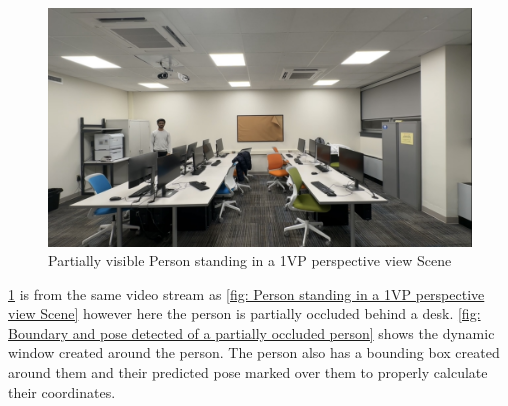 \begin{figure}[H]
    \centering
    \includegraphics[width=1.0\textwidth]{1vp partial person.jpg}
    \caption{Partially visible Person standing in a 1VP perspective view Scene}
    \label{fig: Partially visible Person standing in a 1VP perspective view Scene}
\end{figure}

\ref{fig: Partially visible Person standing in a 1VP perspective view Scene} is from the same video stream as \ref{fig: Person standing in a 1VP perspective view Scene} however here the person is partially occluded behind a desk. \ref{fig: Boundary and pose detected of a partially occluded person} shows the dynamic window created around the person. The person also has a bounding box created around them and their predicted pose marked over them to properly calculate their coordinates.\newline

